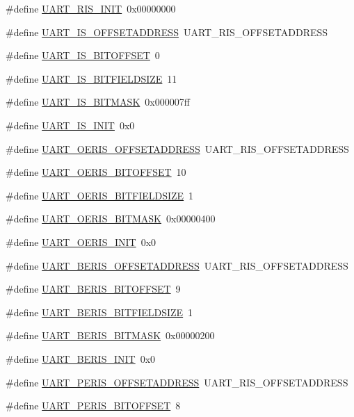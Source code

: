 \begin{DoxyCompactItemize}
\item 
\#define \hyperlink{a00575_ab59a1b0a385deac9efa01a5f5bfbd27a}{UART\_\-RIS\_\-INIT}~0x00000000
\item 
\#define \hyperlink{a00575_a5a0bfdc6053f52ed9a111d238eb1002b}{UART\_\-IS\_\-OFFSETADDRESS}~UART\_\-RIS\_\-OFFSETADDRESS
\item 
\#define \hyperlink{a00575_a0b62695c05ab1bc7e415dbaaa5c9bfc8}{UART\_\-IS\_\-BITOFFSET}~0
\item 
\#define \hyperlink{a00575_a9823ff9ee506397979914fc1750db5a1}{UART\_\-IS\_\-BITFIELDSIZE}~11
\item 
\#define \hyperlink{a00575_a31e15880966e66c84cc8e629fc3e2e58}{UART\_\-IS\_\-BITMASK}~0x000007ff
\item 
\#define \hyperlink{a00575_a57b3b2a3b442cafa19c0707e3afca72b}{UART\_\-IS\_\-INIT}~0x0
\item 
\#define \hyperlink{a00575_abb228a4d2e303af8138a1f804859afe0}{UART\_\-OERIS\_\-OFFSETADDRESS}~UART\_\-RIS\_\-OFFSETADDRESS
\item 
\#define \hyperlink{a00575_a82b84ac35ede47d592a1aa4d45560c76}{UART\_\-OERIS\_\-BITOFFSET}~10
\item 
\#define \hyperlink{a00575_ab6fc94ebc5054ddb3a207229f9905c2b}{UART\_\-OERIS\_\-BITFIELDSIZE}~1
\item 
\#define \hyperlink{a00575_ab16d2c80e49eae0a66441015c90ccece}{UART\_\-OERIS\_\-BITMASK}~0x00000400
\item 
\#define \hyperlink{a00575_afc2bee6699e7d3aa61f559980ea8ec69}{UART\_\-OERIS\_\-INIT}~0x0
\item 
\#define \hyperlink{a00575_a855e52c5715a4708e44f3885c31cbe7d}{UART\_\-BERIS\_\-OFFSETADDRESS}~UART\_\-RIS\_\-OFFSETADDRESS
\item 
\#define \hyperlink{a00575_ab3e8c422f42983e876521c868df613ea}{UART\_\-BERIS\_\-BITOFFSET}~9
\item 
\#define \hyperlink{a00575_abe02c862ea519a5342da68e629fb794e}{UART\_\-BERIS\_\-BITFIELDSIZE}~1
\item 
\#define \hyperlink{a00575_a0e8ab3c4743abaddf94b427081f85bd1}{UART\_\-BERIS\_\-BITMASK}~0x00000200
\item 
\#define \hyperlink{a00575_a114b9491630497e0f5a7f64b7e13b2d5}{UART\_\-BERIS\_\-INIT}~0x0
\item 
\#define \hyperlink{a00575_a2d4aa0fbe2682f0ebed0f8a700b1b766}{UART\_\-PERIS\_\-OFFSETADDRESS}~UART\_\-RIS\_\-OFFSETADDRESS
\item 
\#define \hyperlink{a00575_abd1833b618070788ad47a6be09a2abb4}{UART\_\-PERIS\_\-BITOFFSET}~8

\end{DoxyCompactItemize}
